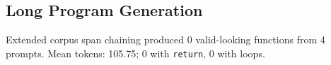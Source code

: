 \subsection{Long Program Generation}
Extended corpus span chaining produced 0 valid-looking functions from 4 prompts.
Mean tokens: 105.75; 0 with \texttt{return}, 0 with loops.
